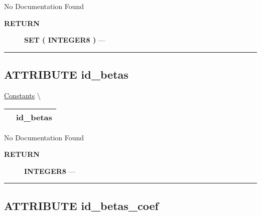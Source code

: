 \par





No Documentation Found








\par
\begin{description}
\item [\colorbox{tagtype}{\color{white} \textbf{\textsf{RETURN}}}] \textbf{SET ( INTEGER8 )} --- 
\end{description}




\rule{\linewidth}{0.5pt}
\subsection*{\textsf{\colorbox{headtoc}{\color{white} ATTRIBUTE}
id\_betas}}

\hypertarget{ecldoc:logisticregression.constants.id_betas}{}
\hspace{0pt} \hyperlink{ecldoc:LogisticRegression.Constants}{Constants} \textbackslash 

{\renewcommand{\arraystretch}{1.5}
\begin{tabularx}{\textwidth}{|>{\raggedright\arraybackslash}l|X|}
\hline
\hspace{0pt}\mytexttt{\color{red} } & \textbf{id\_betas} \\
\hline
\end{tabularx}
}

\par





No Documentation Found








\par
\begin{description}
\item [\colorbox{tagtype}{\color{white} \textbf{\textsf{RETURN}}}] \textbf{INTEGER8} --- 
\end{description}




\rule{\linewidth}{0.5pt}
\subsection*{\textsf{\colorbox{headtoc}{\color{white} ATTRIBUTE}
id\_betas\_coef}}

